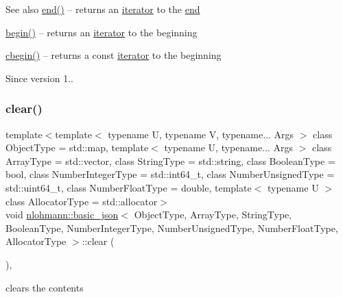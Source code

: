 \begin{DoxySeeAlso}{See also}
\hyperlink{classnlohmann_1_1basic__json_a12ccf14d39ddae52f6c7e126105a230b}{end()} -- returns an \hyperlink{classnlohmann_1_1basic__json_1_1iterator}{iterator} to the \hyperlink{classnlohmann_1_1basic__json_a12ccf14d39ddae52f6c7e126105a230b}{end} 

\hyperlink{classnlohmann_1_1basic__json_ad4e381c54039607be08d7af41a1f6ad1}{begin()} -- returns an \hyperlink{classnlohmann_1_1basic__json_1_1iterator}{iterator} to the beginning 

\hyperlink{classnlohmann_1_1basic__json_a7355a41b0033ff8a27d58550544d5a59}{cbegin()} -- returns a const \hyperlink{classnlohmann_1_1basic__json_1_1iterator}{iterator} to the beginning
\end{DoxySeeAlso}
\begin{DoxySince}{Since}
version 1.. 
\end{DoxySince}
\hypertarget{classnlohmann_1_1basic__json_ad6e51670e9c0052856f3fee01df5c44f}{}\label{classnlohmann_1_1basic__json_ad6e51670e9c0052856f3fee01df5c44f} 
\subsubsection{\texorpdfstring{clear()}{clear()}}
{\footnotesize\ttfamily template$<$template$<$ typename U, typename V, typename... Args $>$ class Object\+Type = std\+::map, template$<$ typename U, typename... Args $>$ class Array\+Type = std\+::vector, class String\+Type  = std\+::string, class Boolean\+Type  = bool, class Number\+Integer\+Type  = std\+::int64\+\_\+t, class Number\+Unsigned\+Type  = std\+::uint64\+\_\+t, class Number\+Float\+Type  = double, template$<$ typename U $>$ class Allocator\+Type = std\+::allocator$>$ \\
void \hyperlink{classnlohmann_1_1basic__json}{nlohmann\+::basic\+\_\+json}$<$ Object\+Type, Array\+Type, String\+Type, Boolean\+Type, Number\+Integer\+Type, Number\+Unsigned\+Type, Number\+Float\+Type, Allocator\+Type $>$\+::clear (\begin{DoxyParamCaption}{ }\end{DoxyParamCaption})\hspace{0.3cm}{\ttfamily [inline]}, {\ttfamily [noexcept]}}



clears the contents 


